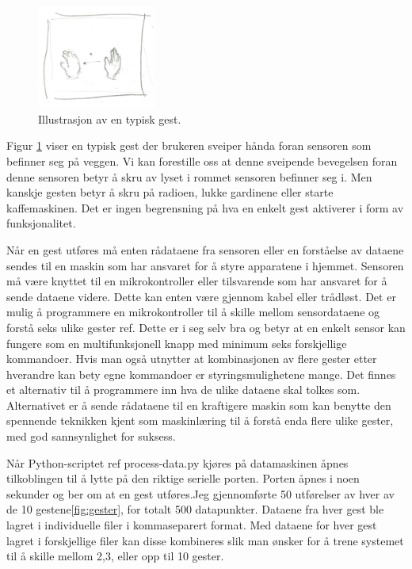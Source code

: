 \begin{figure}
    \vspace{-20pt}
  \begin{center}
    \includegraphics[width=0.35\textwidth]{fig/swipe-l-r}
  \end{center}
  \vspace{-20pt}
  \caption{Illustrasjon av en typisk gest.}
  \label{fig:gest}
  \vspace{-7pt}
\end{figure}

Figur \ref{fig:gest} viser en typisk gest der brukeren sveiper hånda foran sensoren som befinner seg på veggen. Vi kan forestille oss at denne sveipende bevegelsen foran denne sensoren betyr å skru av lyset i rommet sensoren befinner seg i. Men kanskje gesten betyr å skru på radioen, lukke gardinene eller starte kaffemaskinen. Det er ingen begrensning på hva en enkelt gest aktiverer i form av funksjonalitet.

Når en gest utføres må enten rådataene fra sensoren eller en forståelse av dataene sendes til en maskin som har ansvaret for å styre apparatene i hjemmet. Sensoren må være knyttet til en mikrokontroller eller tilsvarende som har ansvaret for å sende dataene videre. Dette kan enten være gjennom kabel eller trådløst. Det er mulig å programmere en mikrokontroller til å skille mellom sensordataene og forstå seks ulike gester {\color{red} ref}. Dette er i seg selv bra og betyr at en enkelt sensor kan fungere som en multifunksjonell knapp med minimum seks forskjellige kommandoer. Hvis man også utnytter at kombinasjonen av flere gester etter hverandre kan bety egne kommandoer er styringsmulighetene mange. Det finnes et alternativ til å programmere inn hva de ulike dataene skal tolkes som. Alternativet er å sende rådataene til en kraftigere maskin som kan benytte den spennende teknikken kjent som maskinlæring til å forstå enda flere ulike gester, med god sannsynlighet for suksess.


Når Python-scriptet{\color{red} ref process-data.py} kjøres på datamaskinen åpnes tilkoblingen til å lytte på den riktige serielle porten. Porten åpnes i noen sekunder og ber om at en gest utføres.Jeg gjennomførte 50 utførelser av hver av de 10 gestene\ref{fig:gester}, for totalt 500 datapunkter. Dataene fra hver gest ble lagret i individuelle filer i kommaseparert format. Med dataene for hver gest lagret i forskjellige filer kan disse kombineres slik man ønsker for å trene systemet til å skille mellom 2,3, eller opp til 10 gester. 


